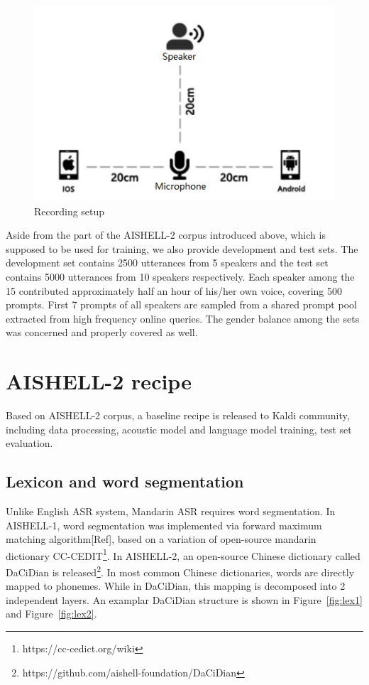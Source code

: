 \documentclass[a4paper]{article}
\begin{document}
\begin{figure}[t]
  \centering
  \includegraphics[width=\linewidth]{setup.jpg}
  \caption{Recording setup}
  \label{fig:setup}
\end{figure}

\noindent Aside from the part of the AISHELL-2 corpus introduced above, which is supposed to be used for training, we also provide development and test sets. The development set contains 2500 utterances from 5 speakers and the test set contains 5000 utterances from 10 speakers respectively. Each speaker among the 15 contributed approximately half an hour of his/her own voice, covering 500 prompts. First 7 prompts of all speakers are sampled from a shared prompt pool extracted from high frequency online queries. The gender balance among the sets was concerned and properly covered as well.

\section{AISHELL-2 recipe}

Based on AISHELL-2 corpus, a baseline recipe is released to Kaldi community, including
data processing, acoustic model and language model training, test set evaluation.

\subsection{Lexicon and word segmentation}

Unlike English ASR system, Mandarin ASR requires word segmentation. 
In AISHELL-1, word segmentation was implemented via forward
maximum matching algorithm[Ref], based on a variation of open-source mandarin
dictionary CC-CEDIT\footnote{https://cc-cedict.org/wiki}. In AISHELL-2, an
open-source Chinese dictionary called DaCiDian is
released\footnote{https://github.com/aishell-foundation/DaCiDian}. In most
common Chinese dictionaries, words are directly mapped to phonemes. While in
DaCiDian, this mapping is decomposed into 2 independent layers. An examplar
DaCiDian structure is shown in Figure~\ref{fig:lex1} and Figure~\ref{fig:lex2}.
\end{document}
